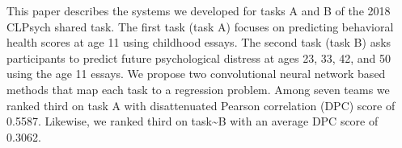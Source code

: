 This paper describes the systems we developed for tasks A and B of the 2018 CLPsych shared task. The first task (task A) focuses on predicting behavioral health scores at age 11 using childhood essays. The second task (task B) asks participants to predict future psychological distress at ages 23, 33, 42, and 50 using the age 11 essays. We propose two convolutional neural network based methods that map each task to a regression problem. Among seven teams we ranked third on task A with disattenuated Pearson correlation (DPC) score of 0.5587. Likewise, we ranked third on task{\textasciitilde}B with an average DPC score of 0.3062.
